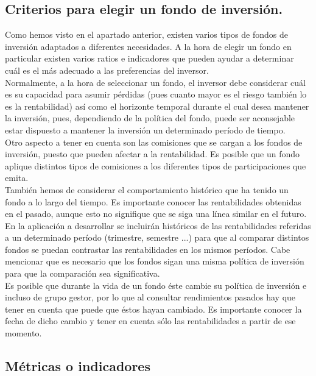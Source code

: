 \documentclass[12pt, a4paper]{book}
\begin{document}
\subsection{Criterios para elegir un fondo de inversión.}


Como hemos visto en el apartado anterior, existen varios tipos de fondos de inversión adaptados a diferentes necesidades. A la hora de elegir un fondo en particular existen varios ratios e indicadores que pueden ayudar a determinar cuál es el más adecuado a las preferencias del inversor.\\

Normalmente, a la hora de seleccionar un fondo, el inversor debe considerar cuál es su capacidad para asumir pérdidas (pues cuanto mayor es el riesgo también lo es la rentabilidad) así como el horizonte temporal durante el cual desea mantener la inversión, pues, dependiendo de la política del fondo, puede ser aconsejable estar dispuesto a mantener la inversión un determinado período de tiempo.\\

Otro aspecto a tener en cuenta son las comisiones que se cargan a los fondos de inversión, puesto que pueden afectar a la rentabilidad. Es posible que un fondo aplique distintos tipos de comisiones a los diferentes tipos de participaciones que emita.\\

También hemos de considerar el comportamiento histórico que ha tenido un fondo a lo largo del tiempo. Es importante conocer las rentabilidades obtenidas en el pasado, aunque esto no signifique que se siga una línea similar en el futuro. En la aplicación a desarrollar se incluirán históricos de las rentabilidades referidas a un determinado período (trimestre, semestre ...) para que al comparar distintos fondos se puedan contrastar las rentabilidades en los mismos períodos. Cabe mencionar que es necesario que los fondos sigan una misma política de inversión para que la comparación sea significativa.\\

Es posible que durante la vida de un fondo éste cambie su política de inversión e incluso de grupo gestor, por lo que al consultar rendimientos pasados hay que tener en cuenta que puede que éstos hayan cambiado. Es importante conocer la fecha de dicho cambio y tener en cuenta sólo las rentabilidades a partir de ese momento.\\

\newpage

 \subsection{Métricas o indicadores}
\end{document}

